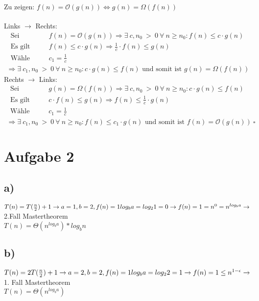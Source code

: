\documentclass[a4paper]{scrartcl}
\begin{document}
Zu zeigen: $f(n) = \mathcal{O}(g(n)) \Longleftrightarrow g(n) = \Omega(f(n))$ \\ \\
Links $\rightarrow$ Rechts:
\begin{align*}
\text{Sei } &&& f(n) = \mathcal{O}(g(n)) \Rightarrow \exists ~ c {,} n_0 ~ {>} ~ 0 ~ \forall ~ n \geq n_0 : f(n) \leq c \cdot g(n) \\
\text{Es gilt } &&& f(n) \leq c \cdot g(n) \Rightarrow \frac{1}{c} \cdot f(n) \leq g(n) \\
\text{Wähle } &&& c_1 = \frac{1}{c}
\end{align*} 
\begin{align*}
\Rightarrow \exists ~ c_1, n_0 ~ {>} ~ 0 ~ \forall ~ n \geq n_0 : c \cdot g(n) \leq f(n) \text{ und somit ist } g(n) = \Omega(f(n))
\end{align*}
Rechts $\rightarrow$ Links:
\begin{align*}
\text{Sei } &&& g(n) = \Omega(f(n)) \Rightarrow \exists ~ c {,} n_0 ~ {>} ~ 0 ~ \forall ~ n \geq n_0 : c \cdot g(n) \leq f(n) \\
\text{Es gilt } &&& c \cdot f(n) \leq g(n) \Rightarrow f(n) \leq \frac{1}{c} \cdot g(n) \\
\text{Wähle } &&& c_1 = \frac{1}{c}
\end{align*} 
\begin{align*}
\Rightarrow \exists ~ c_1, n_0 ~ {>} ~ 0 ~ \forall ~ n \geq n_0 : f(n) \leq c_1 \cdot g(n) \text{ und somit ist } f(n) = \mathcal{O}(g(n))  ~ \square
\end{align*}

\section*{Aufgabe 2}
\subsection*{a)}
$T(n)=T(\frac{n}{2})+1\\
 \rightarrow a=1, b=2, f(n)=1\\
 log_b a = log_2 1=0\\
 \rightarrow f(n)=1 = n^0=n^{log_ba} \rightarrow$ 2.Fall Mastertheorem\\
$ T(n) = \Theta(n^{log_ba})*log_bn$
 \subsection*{b)}
$T(n)=2T(\frac{n}{2})+1\\
 \rightarrow a=2, b=2, f(n)=1\\
 log_b a = log_2 2=1\\
 \rightarrow f(n)=1 \leq n^{1-\epsilon} \rightarrow$ 1. Fall Mastertheorem\\
 $T(n)=\Theta(n^{log_ba})$
\end{document}
